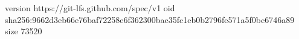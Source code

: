 version https://git-lfs.github.com/spec/v1
oid sha256:9662d3eb66e76baf72258e6f362300bac35fc1eb0b2796fe571a5f0bc6746a89
size 73520
